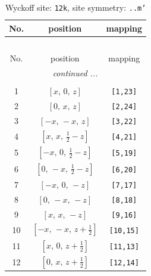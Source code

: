 \documentclass[fleqn,8pt]{jsarticle}
\begin{document}
\begin{longtable}{ccc}
\caption{Wyckoff site: {\tt 12k}, site symmetry: {\tt ..m'}}
 \\
 \hline \hline
No. & position & mapping \\ \hline \endfirsthead

\multicolumn{2}{l}{\tablename\ \thetable{}} \\
 \hline \hline
No. & position & mapping \\ \hline \endhead

 \hline \hline
\multicolumn{2}{r}{\footnotesize\it continued ...} \\ \endfoot

 \hline \hline
\multicolumn{2}{r}{} \\ \endlastfoot

1 & $\left[ x,\, 0,\, z \right]$ & {\tt [1,23]} \\ \hline
2 & $\left[ 0,\, x,\, z \right]$ & {\tt [2,24]} \\ \hline
3 & $\left[ - x,\, - x,\, z \right]$ & {\tt [3,22]} \\ \hline
4 & $\left[ x,\, x,\, \frac{1}{2} - z \right]$ & {\tt [4,21]} \\ \hline
5 & $\left[ - x,\, 0,\, \frac{1}{2} - z \right]$ & {\tt [5,19]} \\ \hline
6 & $\left[ 0,\, - x,\, \frac{1}{2} - z \right]$ & {\tt [6,20]} \\ \hline
7 & $\left[ - x,\, 0,\, - z \right]$ & {\tt [7,17]} \\ \hline
8 & $\left[ 0,\, - x,\, - z \right]$ & {\tt [8,18]} \\ \hline
9 & $\left[ x,\, x,\, - z \right]$ & {\tt [9,16]} \\ \hline
10 & $\left[ - x,\, - x,\, z + \frac{1}{2} \right]$ & {\tt [10,15]} \\ \hline
11 & $\left[ x,\, 0,\, z + \frac{1}{2} \right]$ & {\tt [11,13]} \\ \hline
12 & $\left[ 0,\, x,\, z + \frac{1}{2} \right]$ & {\tt [12,14]} \\
\end{longtable}
\renewcommand{\arraystretch}{1.2}
\end{document}
